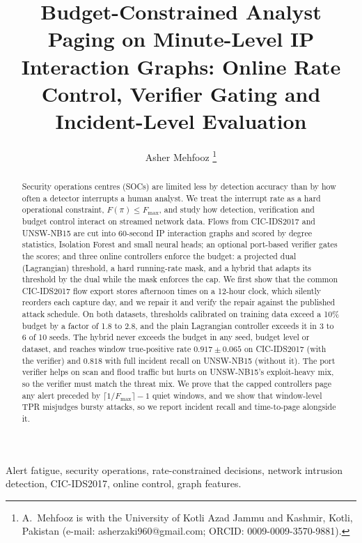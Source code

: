 \documentclass[journal,10pt,twocolumn]{IEEEtran}
\newcommand{\Fmax}{F_{\max}}
\begin{document}
\title{Budget-Constrained Analyst Paging on Minute-Level IP Interaction Graphs: Online Rate Control, Verifier Gating and Incident-Level Evaluation}
\author{Asher Mehfooz%
\thanks{A.\ Mehfooz is with the University of Kotli Azad Jammu and Kashmir, Kotli, Pakistan (e-mail: asherzaki960@gmail.com; ORCID: 0009-0009-3570-9881).}}
\maketitle

\begin{abstract}
Security operations centres (SOCs) are limited less by detection accuracy than by how often a detector interrupts a human analyst. We treat the interrupt rate as a hard operational constraint, $F(\pi)\le\Fmax$, and study how detection, verification and budget control interact on streamed network data. Flows from CIC-IDS2017 and UNSW-NB15 are cut into 60-second IP interaction graphs and scored by degree statistics, Isolation Forest and small neural heads; an optional port-based verifier gates the scores; and three online controllers enforce the budget: a projected dual (Lagrangian) threshold, a hard running-rate mask, and a hybrid that adapts its threshold by the dual while the mask enforces the cap. We first show that the common CIC-IDS2017 flow export stores afternoon times on a 12-hour clock, which silently reorders each capture day, and we repair it and verify the repair against the published attack schedule. On both datasets, thresholds calibrated on training data exceed a 10\% budget by a factor of 1.8 to 2.8, and the plain Lagrangian controller exceeds it in 3 to 6 of 10 seeds. The hybrid never exceeds the budget in any seed, budget level or dataset, and reaches window true-positive rate $0.917\pm0.065$ on CIC-IDS2017 (with the verifier) and $0.818$ with full incident recall on UNSW-NB15 (without it). The port verifier helps on scan and flood traffic but hurts on UNSW-NB15's exploit-heavy mix, so the verifier must match the threat mix. We prove that the capped controllers page any alert preceded by $\lceil 1/\Fmax\rceil-1$ quiet windows, and we show that window-level TPR misjudges bursty attacks, so we report incident recall and time-to-page alongside it.
\end{abstract}

\begin{IEEEkeywords}
Alert fatigue, security operations, rate-constrained decisions, network intrusion detection, CIC-IDS2017, online control, graph features.
\end{IEEEkeywords}
\end{document}
